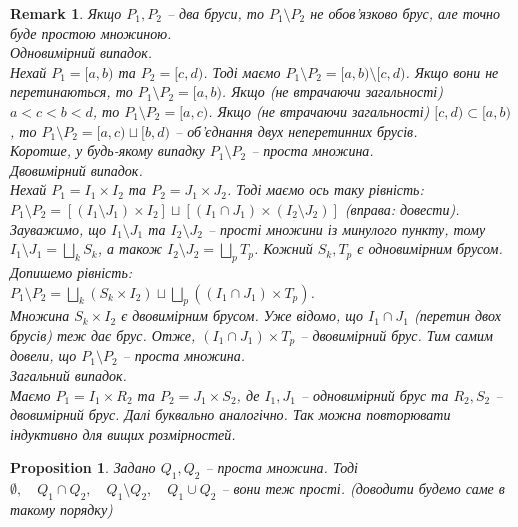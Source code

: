 \documentclass[a4paper, 10pt]{article}
\theoremstyle{theoremdd}
\theoremstyle{theoremdd}
\theoremstyle{theoremdd}
\theoremstyle{theoremdd}
\theoremstyle{theoremdd}
\theoremstyle{theoremdd}
\theoremstyle{theoremdd}
\theoremstyle{theoremdd}
\theoremstyle{theoremdd}
\newtheorem{proposition}[theorem]{Proposition}
\theoremstyle{theoremdd}
\theoremstyle{theoremdd}
\newtheorem{remark}[theorem]{Remark}
\theoremstyle{theoremdd}
\theoremstyle{theoremdd}
\theoremstyle{theoremdd}
\theoremstyle{theoremdd}
\begin{document}
\begin{remark}
Якщо $P_1,P_2$ -- два бруси, то $P_1 \setminus P_2$ не обов'язково брус, але точно буде простою множиною.\\
\textit{Одновимірний випадок}.\\
Нехай $P_1 = [a,b)$ та $P_2 = [c,d)$. Тоді маємо $P_1 \setminus P_2 = [a,b) \setminus [c,d)$. Якщо вони не перетинаються, то $P_1 \setminus P_2 = [a,b)$. Якщо (не втрачаючи загальності) $a < c < b < d$, то $P_1 \setminus P_2 = [a,c)$. Якщо (не втрачаючи загальності) $[c,d) \subset [a,b)$, то $P_1 \setminus P_2 = [a,c) \sqcup [b,d)$ -- об'єднання двух неперетинних брусів.\\
Коротше, у будь-якому випадку $P_1 \setminus P_2$ -- проста множина.
\bigskip \\
\textit{Двовимірний випадок}.\\
Нехай $P_1 = I_1 \times I_2$ та $P_2 = J_1 \times J_2$. Тоді маємо ось таку рівність:\\
$P_1 \setminus P_2 = [(I_1 \setminus J_1) \times I_2] \sqcup [(I_1 \cap J_1) \times (I_2 \setminus J_2)]$ (вправа: довести).\\
Зауважимо, що $I_1 \setminus J_1$ та $I_2 \setminus J_2$ -- прості множини із минулого пункту, тому $I_1 \setminus J_1 = \displaystyle\bigsqcup_k S_k$, а також $I_2 \setminus J_2 = \displaystyle\bigsqcup_p T_p$. Кожний $S_k, T_p$ є одновимірним брусом. Допишемо рівність:\\
$P_1 \setminus P_2 = \displaystyle\bigsqcup_k (S_k \times I_2) \sqcup \bigsqcup_p ((I_1 \cap J_1) \times T_p)$.\\
Множина $S_k \times I_2$ є двовимірним брусом. Уже відомо, що $I_1 \cap J_1$ (перетин двох брусів) теж дає брус. Отже, $(I_1 \cap J_1) \times T_p$ -- двовимірний брус. Тим самим довели, що $P_1 \setminus P_2$ -- проста множина.
\bigskip \\
\textit{Загальний випадок}.\\
Маємо $P_1 = I_1 \times R_2$ та $P_2 = J_1 \times S_2$, де $I_1,J_1$ -- одновимірний брус та $R_2,S_2$ -- двовимірний брус. Далі буквально аналогічно. Так можна повторювати індуктивно для вищих розмірностей.
\end{remark}

\begin{proposition}
Задано $Q_1,Q_2$ -- проста множина. Тоді $\emptyset, \quad Q_1 \cap Q_2, \quad Q_1 \setminus Q_2, \quad Q_1 \cup Q_2$ -- вони теж прості. (доводити будемо саме в такому порядку)
\end{proposition}
\end{document}
